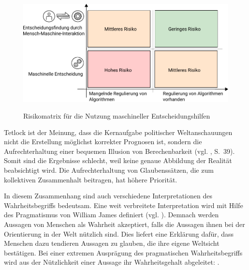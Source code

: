 
 

\begin{figure}%
\centering
\caption{Risikomatrix für die Nutzung maschineller Entscheidungshilfen}
\includegraphics[scale=1.0]{Grafiken/Risk_Matrix_Ink.pdf} 
\label{pic:Risiko_Matrix}
\end{figure}





% 


Tetlock ist der Meinung, dass die Kernaufgabe politischer Weltanschauungen
nicht die Erstellung möglichst korrekter Prognosen ist, sondern die
Aufrechterhaltung einer bequemen Illusion von Berechenbarkeit
(vgl. \cite{Tetlock}, S.~39). Somit sind die Ergebnisse schlecht, weil keine
genaue Abbildung der Realität beabsichtigt wird. Die Aufrechterhaltung von
Glaubenssätzen, die zum kollektiven Zusammenhalt beitragen, hat höhere
Priorität.

In diesem Zusammenhang sind auch verschiedene Interpretationen des
Wahrheitsbegriffs bedeutsam. Eine weit verbreitete Interpretation wird mit
Hilfe des Pragmatismus von William James definiert (vgl. \cite{Precht}). Demnach werden
Aussagen von Menschen als Wahrheit akzeptiert, falls die Aussagen ihnen bei der
Orientierung in der Welt nützlich sind. Dies liefert eine Erklärung dafür, dass
Menschen dazu tendieren Aussagen zu glauben, die ihre eigene Weltsicht
bestätigen. Bei einer extremen Ausprägung des pragmatischen Wahrheitsbegriffs
wird aus der Nützlichkeit einer Aussage ihr Wahrheitsgehalt abgeleitet:
\grqq.

